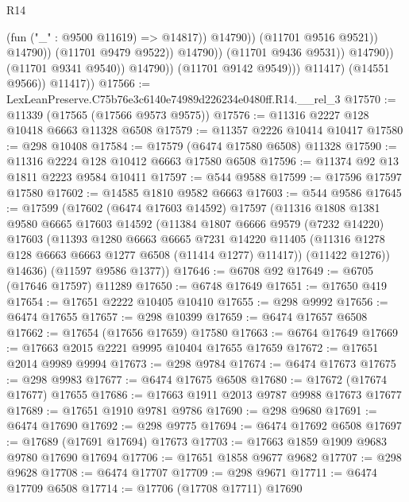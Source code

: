 \begin{lexlean}{R14}
\begin{coremodule}
                                              (fun ("_" : @9500 @11619) => @14817))
                                            @14790))
                                        (@11701 @9516 @9521))
                                      @14790))
                                  (@11701 @9479 @9522))
                                @14790))
                            (@11701 @9436 @9531))
                          @14790))
                      (@11701 @9341 @9540))
                    @14790))
                (@11701 @9142 @9549)))
            @11417)
          (@14551 @9566))
        @11417))
@17566 := LexLeanPreserve.C75b76e3c6140e74989d226234e0480ff.R14.__rel_3
@17570 := @11339 (@17565 (@17566 @9573 @9575))
@17576 := @11316 @2227 @128 @10418 @6663 @11328 @6508
@17579 := @11357 @2226 @10414 @10417
@17580 := @298 @10408
@17584 := @17579 (@6474 @17580 @6508) @11328
@17590 := @11316 @2224 @128 @10412 @6663 @17580 @6508
@17596 := @11374 @92 @13 @1811 @2223 @9584 @10411
@17597 := @544 @9588
@17599 := @17596 @17597 @17580
@17602 := @14585 @1810 @9582 @6663
@17603 := @544 @9586
@17645 := @17599
    (@17602
      (@6474 @17603 @14592)
      @17597
      (@11316
        @1808
        @1381
        @9580
        @6665
        @17603
        @14592
        (@11384
          @1807
          @6666
          @9579
          (@7232 @14220)
          @17603
          (@11393
            @1280
            @6663
            @6665
            @7231
            @14220
            @11405
            (@11316 @1278 @128 @6663 @6663 @1277 @6508 (@11414 @1277) @11417))
          (@11422 @1276))
        @14636)
      (@11597 @9586 @1377))
@17646 := @6708 @92
@17649 := @6705 (@17646 @17597) @11289
@17650 := @6748 @17649
@17651 := @17650 @419
@17654 := @17651 @2222 @10405 @10410
@17655 := @298 @9992
@17656 := @6474 @17655
@17657 := @298 @10399
@17659 := @6474 @17657 @6508
@17662 := @17654 (@17656 @17659) @17580
@17663 := @6764 @17649
@17669 := @17663 @2015 @2221 @9995 @10404 @17655 @17659
@17672 := @17651 @2014 @9989 @9994
@17673 := @298 @9784
@17674 := @6474 @17673
@17675 := @298 @9983
@17677 := @6474 @17675 @6508
@17680 := @17672 (@17674 @17677) @17655
@17686 := @17663 @1911 @2013 @9787 @9988 @17673 @17677
@17689 := @17651 @1910 @9781 @9786
@17690 := @298 @9680
@17691 := @6474 @17690
@17692 := @298 @9775
@17694 := @6474 @17692 @6508
@17697 := @17689 (@17691 @17694) @17673
@17703 := @17663 @1859 @1909 @9683 @9780 @17690 @17694
@17706 := @17651 @1858 @9677 @9682
@17707 := @298 @9628
@17708 := @6474 @17707
@17709 := @298 @9671
@17711 := @6474 @17709 @6508
@17714 := @17706 (@17708 @17711) @17690

\end{coremodule}
\end{lexlean}
